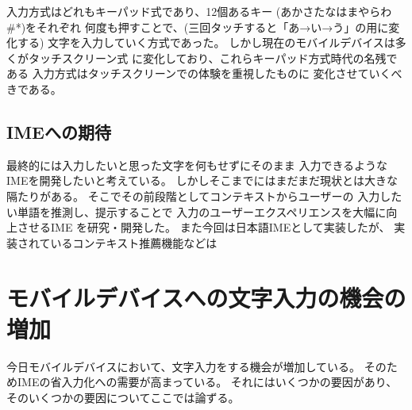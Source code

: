入力方式はどれもキーパッド式であり、12個あるキー
(あかさたなはまやらわ\#*)をそれぞれ
何度も押すことで、(三回タッチすると「あ→い→う」の用に変化する)
文字を入力していく方式であった。
しかし現在のモバイルデバイスは多くがタッチスクリーン式
に変化しており、これらキーパッド方式時代の名残である
入力方式はタッチスクリーンでの体験を重視したものに
変化させていくべきである。\cite{designinginterface}

\subsection{IMEへの期待}
最終的には入力したいと思った文字を何もせずにそのまま
入力できるようなIMEを開発したいと考えている。
しかしそこまでにはまだまだ現状とは大きな隔たりがある。
そこでその前段階としてコンテキストからユーザーの
入力したい単語を推測し、提示することで
入力のユーザーエクスペリエンスを大幅に向上させるIME
を研究・開発した。
また今回は日本語IMEとして実装したが、
実装されているコンテキスト推薦機能などは

\section{モバイルデバイスへの文字入力の機会の増加}
今日モバイルデバイスにおいて、文字入力をする機会が増加している。
そのためIMEの省入力化への需要が高まっている。
それにはいくつかの要因があり、
そのいくつかの要因についてここでは論ずる。

